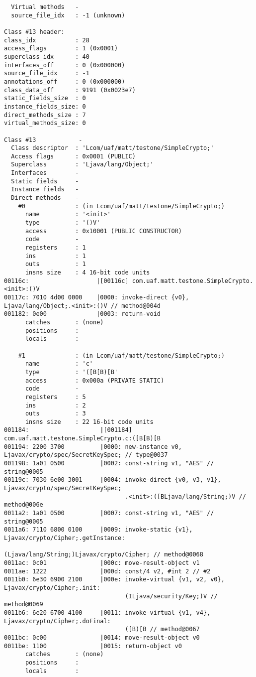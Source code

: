\begin{lstlisting}
  Virtual methods   -
  source_file_idx   : -1 (unknown)

Class #13 header:
class_idx           : 28
access_flags        : 1 (0x0001)
superclass_idx      : 40
interfaces_off      : 0 (0x000000)
source_file_idx     : -1
annotations_off     : 0 (0x000000)
class_data_off      : 9191 (0x0023e7)
static_fields_size  : 0
instance_fields_size: 0
direct_methods_size : 7
virtual_methods_size: 0

Class #13            -
  Class descriptor  : 'Lcom/uaf/matt/testone/SimpleCrypto;'
  Access flags      : 0x0001 (PUBLIC)
  Superclass        : 'Ljava/lang/Object;'
  Interfaces        -
  Static fields     -
  Instance fields   -
  Direct methods    -
    #0              : (in Lcom/uaf/matt/testone/SimpleCrypto;)
      name          : '<init>'
      type          : '()V'
      access        : 0x10001 (PUBLIC CONSTRUCTOR)
      code          -
      registers     : 1
      ins           : 1
      outs          : 1
      insns size    : 4 16-bit code units
00116c:                   |[00116c] com.uaf.matt.testone.SimpleCrypto.<init>:()V
00117c: 7010 4d00 0000    |0000: invoke-direct {v0}, Ljava/lang/Object;.<init>:()V // method@004d
001182: 0e00              |0003: return-void
      catches       : (none)
      positions     :
      locals        :

    #1              : (in Lcom/uaf/matt/testone/SimpleCrypto;)
      name          : 'c'
      type          : '([B[B)[B'
      access        : 0x000a (PRIVATE STATIC)
      code          -
      registers     : 5
      ins           : 2
      outs          : 3
      insns size    : 22 16-bit code units
001184:                    |[001184] com.uaf.matt.testone.SimpleCrypto.c:([B[B)[B
001194: 2200 3700          |0000: new-instance v0, Ljavax/crypto/spec/SecretKeySpec; // type@0037
001198: 1a01 0500          |0002: const-string v1, "AES" // string@0005
00119c: 7030 6e00 3001     |0004: invoke-direct {v0, v3, v1}, Ljavax/crypto/spec/SecretKeySpec;
                                  .<init>:([BLjava/lang/String;)V // method@006e
0011a2: 1a01 0500          |0007: const-string v1, "AES" // string@0005
0011a6: 7110 6800 0100     |0009: invoke-static {v1}, Ljavax/crypto/Cipher;.getInstance:
                                  (Ljava/lang/String;)Ljavax/crypto/Cipher; // method@0068
0011ac: 0c01               |000c: move-result-object v1
0011ae: 1222               |000d: const/4 v2, #int 2 // #2
0011b0: 6e30 6900 2100     |000e: invoke-virtual {v1, v2, v0}, Ljavax/crypto/Cipher;.init:
                                  (ILjava/security/Key;)V // method@0069
0011b6: 6e20 6700 4100     |0011: invoke-virtual {v1, v4}, Ljavax/crypto/Cipher;.doFinal:
                                  ([B)[B // method@0067
0011bc: 0c00               |0014: move-result-object v0
0011be: 1100               |0015: return-object v0
      catches       : (none)
      positions     :
      locals        :


\end{lstlisting}
